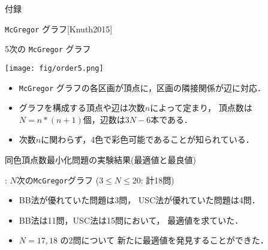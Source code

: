 \documentclass[dvipdfmx,11pt]{beamer}
\newcommand{\code}[1]{\lstinline[basicstyle=\ttfamily]{#1}}
\begin{document}


\appendix
\begin{frame}[noframenumbering]{}
 \thispagestyle{empty}
 \Huge 付録
\end{frame}

\begin{frame}[noframenumbering]{ \code{McGregor} グラフ[Knuth2015]}
 \thispagestyle{empty}
 \begin{exampleblock}{5次の \code{McGregor} グラフ}
  \begin{center}
   \texttt{[image: fig/order5.png]}
  \end{center}
 \end{exampleblock}

 \begin{itemize}
  \item \code{McGregor} グラフの各区画が頂点に，区画の隣接関係が辺に対応．
  \item グラフを構成する頂点や辺は次数$n$によって定まり，
	頂点数は$N=n*(n+1)$個，辺数は$3N-6$本である．%
  \item 次数$n$に関わらず，4色で彩色可能であることが知られている．
 \end{itemize}
\end{frame}
\begin{frame}[noframenumbering]{同色頂点数最小化問題の実験結果(最適値と最良値)}
 \thispagestyle{empty}
 \begin{block}{}
  : $N$次の\code{McGregor}グラフ ($3 \leq N\leq 20$: 計18問)
 \end{block}

 \begin{center}
  
 \end{center}

 \begin{itemize}
  \item BB法が優れていた問題は3問，
        USC法が優れていた問題は4問．
  \item BB法は11問，USC法は15問において，
	最適値を求ていた．
  \item $N = 17,18$ の2問について
	新たに最適値を発見することができた．
 \end{itemize}
\end{frame}
\end{document}
